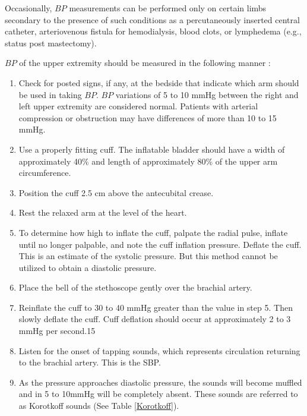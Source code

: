 Occasionally, $BP$ measurements can be performed only on certain limbs secondary to the presence of such conditions as a percutaneously inserted central catheter, arteriovenous fistula for hemodialysis, blood clots, or lymphedema (e.g., status post mastectomy). 

$BP$ of the upper extremity should be measured in the following manner \cite{collins_cardiac_2019}:

\begin{enumerate}
\item Check for posted signs, if any, at the bedside that indicate which arm should be used in taking $BP$. $BP$ variations of 5 to 10 mmHg between the right and left upper extremity are considered normal. Patients with arterial compression or obstruction may have differences of more than 10 to 15 mmHg.
\item Use a properly fitting cuff. The inflatable bladder should have a width of approximately 40\% and length of approximately 80\% of the upper arm circumference.
\item Position the cuff 2.5 cm above the antecubital crease.
\item Rest the relaxed arm at the level of the heart.
\item To determine how high to inflate the cuff, palpate the radial pulse, inflate until no longer palpable, and note the cuff inflation pressure. Deflate the cuff. This is an estimate of the systolic pressure. But this method cannot be utilized to obtain a diastolic pressure.
\item Place the bell of the stethoscope gently over the brachial artery.
\item Reinflate the cuff to 30 to 40 mmHg greater than the value in step 5. Then slowly deflate the cuff. Cuff deflation should occur at approximately 2 to 3 mmHg per second.15
\item Listen for the onset of tapping sounds, which represents circulation returning to the brachial artery. This is the SBP.
\item As the pressure approaches diastolic pressure, the sounds will become muffled and in 5 to 10mmHg will be completely absent. These sounds are referred to as Korotkoff sounds (See Table \ref{Korotkoff}).
\end{enumerate}

